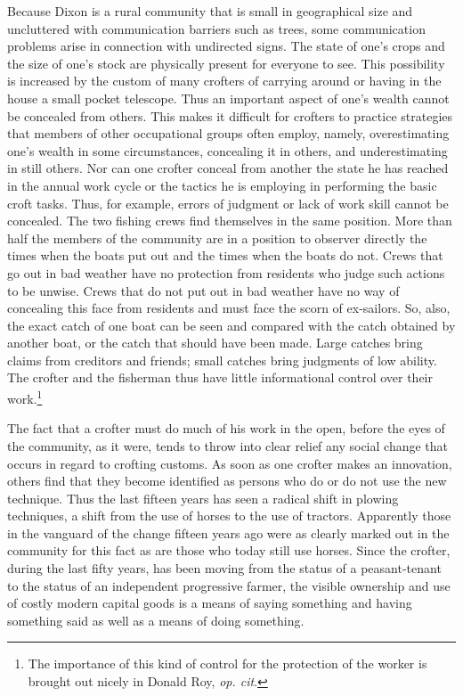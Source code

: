 \documentclass[twoside,symmetric,nobib,justified]{tufte-book}
\begin{document}
Because Dixon is a rural community that is small in geographical size
and uncluttered with communication barriers such as trees, some
communication problems arise in connection with undirected signs. The
state of one's crops and the size of one's stock are physically present
for everyone to see. This possibility is increased by the custom of many
crofters of carrying around or having in the house a small pocket
telescope. Thus an important aspect of one's wealth cannot be concealed
from others. This makes it difficult for crofters to practice strategies
that members of other occupational groups often employ, namely,
overestimating one's wealth in some circumstances, concealing it in
others, and underestimating in still others. Nor can one crofter conceal
from another the state he has reached in the annual work cycle or the
tactics he is employing in performing the basic croft tasks. Thus, for
example, errors of judgment or lack of work skill cannot be concealed.
The two fishing crews find themselves in the same position. More than
half the members of the community are in a position to observer directly
the times when the boats put out and the times when the boats do not.
Crews that go out in bad weather have no protection from residents who
judge such actions to be unwise. Crews that do not put out in bad
weather have no way of concealing this face from residents and must face
the scorn of ex-sailors. So, also, the exact catch of one boat can be
seen and compared with the catch obtained by another boat, or the catch
that should have been made. Large catches bring claims from creditors
and friends; small catches bring judgments of low ability. The crofter
and the fisherman thus have little informational control over their
work.\footnote{The importance of this kind of control for the protection
  of the worker is brought out nicely in Donald Roy, \emph{op. cit}.}

The fact that a crofter must do much of his work in the open, before the
eyes of the community, as it were, tends to throw into clear relief any
social change that occurs in regard to crofting customs. As soon as one
crofter makes an innovation, others find that they become identified as
persons who do or do not use the new technique. Thus the last fifteen
years has seen a radical shift in plowing techniques, a shift from the
use of horses to the use of tractors. Apparently those in the vanguard
of the change fifteen years ago were as clearly marked out in the
community for this fact as are those who today still use horses. Since
the crofter, during the last fifty years, has been moving from the
status of a peasant-tenant to the status of an independent progressive
farmer, the visible ownership and use of costly modern capital goods is
a means of saying something and having something said as well as a means
of doing something.
\end{document}
